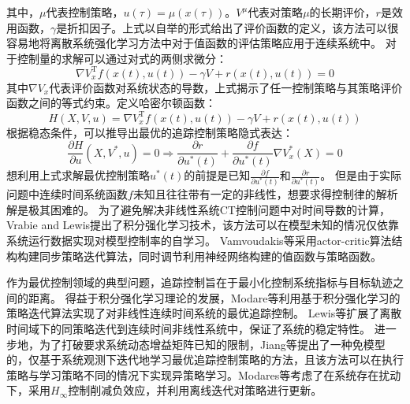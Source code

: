 其中，$\mu$代表控制策略，$u(\tau)=\mu(x(\tau))$。$V^{\mu}$代表对策略$\mu$的长期评价，$r$是效用函数，$\gamma$是折扣因子。上式以自举的形式给出了评价函数的定义，该方法可以很容易地将离散系统强化学习方法中对于值函数的评估策略应用于连续系统中。
对于控制量的求解可以通过对式的两侧求微分：
\begin{equation}
    \nabla V_x^{\mathrm{T}} f(x(t), u(t))-\gamma V+r(x(t), u(t))=0
\end{equation}
其中$\nabla V_x$代表评价函数对系统状态的导数，上式揭示了任一控制策略与其策略评价函数之间的等式约束。定义哈密尔顿函数：
\begin{equation}
    H(X, V, u)=\nabla V_x^{\mathrm{T}} f(x(t), u(t))-\gamma V+r(x(t), u(t))
\end{equation}
根据稳态条件，可以推导出最优的追踪控制策略隐式表达：
\begin{equation}
    \frac{\partial H}{\partial u}\left(X, V^*, u\right)=0 \Rightarrow \frac{\partial r}{\partial u^*(t)}+\frac{\partial f}{\partial u^*(t)} \nabla V_x^*(X)=0
\end{equation}
想利用上式求解最优控制策略$u^*(t)$的前提是已知$\frac{\partial f}{\partial u^*(t)}$和$\frac{\partial r}{\partial u^*(t)}$。
但是由于实际问题中连续时间系统函数$f$未知且往往带有一定的非线性，想要求得控制律的解析解是极其困难的。
为了避免解决非线性系统CT控制问题中对时间导数的计算，Vrabie and Lewis\cite{vrabie2009neural}提出了积分强化学习技术，该方法可以在模型未知的情况仅依靠系统运行数据实现对模型控制率的自学习。
Vamvoudakis等\cite{vamvoudakis2014online}采用actor-critic算法结构构建同步策略迭代算法，同时调节利用神经网络构建的值函数与策略函数。

作为最优控制领域的典型问题，追踪控制旨在于最小化控制系统指标与目标轨迹之间的距离。
得益于积分强化学习理论的发展，Modare等\cite{modares2014linear}利用基于积分强化学习的策略迭代算法实现了对非线性连续时间系统的最优追踪控制。
Lewis等\cite{modares2014optimal}扩展了离散时间域下的同策略迭代到连续时间非线性系统中，保证了系统的稳定特性。
进一步地，为了打破要求系统动态增益矩阵已知的限制，Jiang等\cite{jiang2012computational}提出了一种免模型的，仅基于系统观测下迭代地学习最优追踪控制策略的方法，且该方法可以在执行策略与学习策略不同的情况下实现异策略学习。Modares等\cite{modares2015h}考虑了在系统存在扰动下，采用$H_{\infty}$控制削减负效应，并利用离线迭代对策略进行更新。

